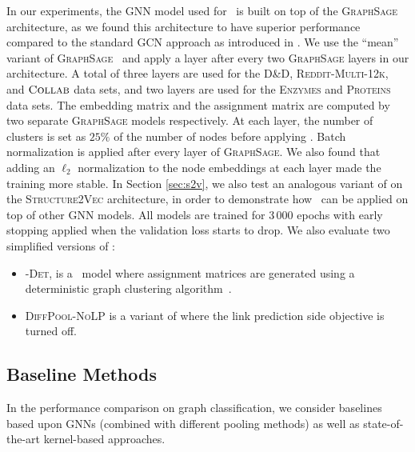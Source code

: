 In our experiments, the GNN model used for \name\ is built on top of the \textsc{GraphSage} architecture, as we found this architecture to have superior performance compared to the standard GCN approach as introduced in \cite{kipf2017semi}. 
We use the ``mean'' variant of \textsc{GraphSage}~\cite{hamilton2017inductive} and apply a \name layer after every two \textsc{GraphSage} layers in our architecture.
A total of three \name layers are used for the \textsc{D\&D}, \textsc{Reddit-Multi-12k}, and $\textsc{Collab}$ data sets, and two \name layers are used for the \textsc{Enzymes} and \textsc{Proteins} data sets.
The embedding matrix and the assignment matrix are computed by two separate \textsc{GraphSage} models respectively.
At each \name layer, the number of clusters is set as $25\%$ of the number of nodes before applying \name.
Batch normalization \cite{ioffe2015batch} is applied after every layer of \textsc{GraphSage}. 
We also found that adding an $\ell_2$ normalization to the node embeddings at each layer made the training more stable. 
In Section \ref{sec:s2v}, we also test an analogous variant of \name on the \textsc{Structure2Vec} \cite{dai2016discriminative} architecture, in order to demonstrate how \name\ can be applied on top of other GNN models. 
All models are trained for 3\,000 epochs with early stopping applied when the validation loss starts to drop.
We also evaluate two simplified versions of \name:
\begin{itemize}[leftmargin=15pt, topsep=-5pt, parsep=0pt]
 \item \textsc{\name-Det}, is a \name\ model where assignment matrices are generated using a deterministic graph clustering algorithm~\cite{dhillon2007weighted}.%
    \item
    \textsc{DiffPool-NoLP} is a variant of \textsc{\name} where the link prediction side objective is turned off.
\end{itemize}

\subsection{Baseline Methods}
In the performance comparison on graph classification, we consider baselines based upon GNNs (combined with different pooling methods) as well as state-of-the-art kernel-based approaches. 

